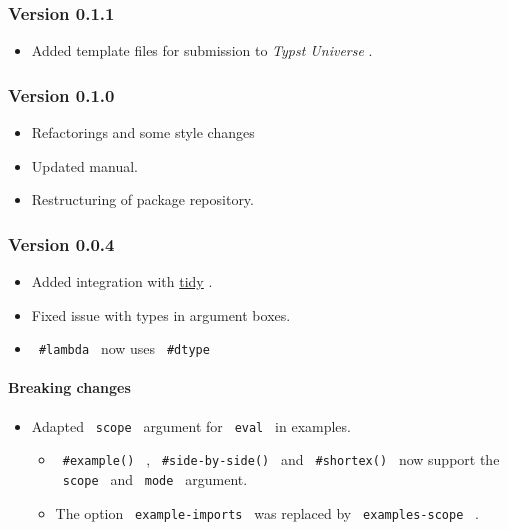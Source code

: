 \subsubsection{Version 0.1.1}\label{version-0.1.1}

\begin{itemize}
\tightlist
\item
  Added template files for submission to \emph{Typst Universe} .
\end{itemize}

\subsubsection{Version 0.1.0}\label{version-0.1.0}

\begin{itemize}
\tightlist
\item
  Refactorings and some style changes
\item
  Updated manual.
\item
  Restructuring of package repository.
\end{itemize}

\subsubsection{Version 0.0.4}\label{version-0.0.4}

\begin{itemize}
\tightlist
\item
  Added integration with \href{https://github.com/Mc-Zen/tidy}{tidy} .
\item
  Fixed issue with types in argument boxes.
\item
  \texttt{\ \#lambda\ } now uses \texttt{\ \#dtype\ }
\end{itemize}

\paragraph{Breaking changes}\label{breaking-changes}

\begin{itemize}
\tightlist
\item
  Adapted \texttt{\ scope\ } argument for \texttt{\ eval\ } in examples.

  \begin{itemize}
  \tightlist
  \item
    \texttt{\ \#example()\ } , \texttt{\ \#side-by-side()\ } and
    \texttt{\ \#shortex()\ } now support the \texttt{\ scope\ } and
    \texttt{\ mode\ } argument.
  \item
    The option \texttt{\ example-imports\ } was replaced by
    \texttt{\ examples-scope\ } .
  \end{itemize}
\end{itemize}

